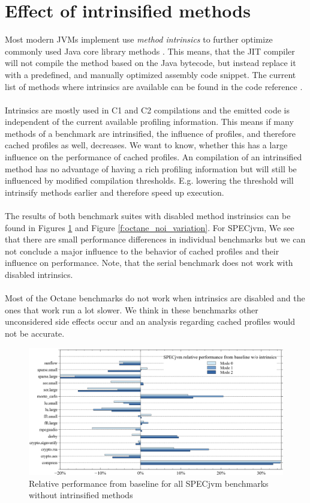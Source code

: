 \section{Effect of intrinsified methods}
\label{s:perf_intrinsics}
Most modern JVMs implement use \textit{method intrinsics} to further optimize commonly used Java core library methods \cite{intrinsics_talk}.
This means, that the JIT compiler will not compile the method based on the Java bytecode, but instead replace it with a predefined, and manually optimized assembly code snippet. The current list of methods where intrinsics are available can be found in the code reference \cite{code_intrinsics}.
\\\\
Intrinsics are mostly used in C1 and C2 compilations and the emitted code is independent of the current available profiling information.
This means if many methods of a benchmark are intrinsified, the influence of profiles, and therefore cached profiles as well, decreases.
We want to know, whether this has a large influence on the performance of cached profiles. An compilation of an intrinsified method has no advantage of having a rich profiling information but will still be influenced by modified compilation thresholds. E.g. lowering the threshold will intrinsify methods earlier and therefore speed up execution.
\\\\
The results of both benchmark suites with disabled method instrinsics can be found in Figures \ref{f:all_warmup_noi_variation} and Figure \ref{f:octane_noi_variation}.
For SPECjvm, We see that there are small performance differences in individual benchmarks but we can not conclude a major influence to the behavior of cached profiles and their influence on performance. Note, that the serial benchmark does not work with disabled intrinsics.
\\\\
Most of the Octane benchmarks do not work when intrinsics are disabled and the ones that work run a lot slower. We think in these benchmarks other unconsidered side effects occur and an analysis regarding cached profiles would not be accurate.
\begin{figure}[ht]
  \begin{center}
    \centering
    \includegraphics[width=1.0\textwidth]{figures/all_warmup_noi_variation.png}
    \caption{Relative performance from baseline for all SPECjvm benchmarks without intrinsified methods}
    \label{f:all_warmup_noi_variation}
  \end{center}
\end{figure}
